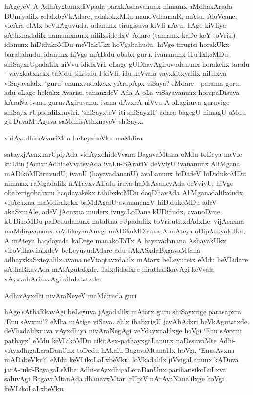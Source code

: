 hAgeyeV A AdhAyxtamxdiVpada parxkAshavanunx nimamx aMdhakArada BUmiyalilx celalxbeVkAdare, adakokxMdu manoVdhamaR, mAtu, AloVcane, vicAra elAlx beVkAguvudu. adanunx tirugisuva kiVli nAvu. hAge kiVliya sAthxnadalilx namamxnunx nililxsidedxV Adare (tamamx kaDe keY toVrisi) idanunx hiDidukoMDu meVlakUkx hoVgabahudu. hiVge tirugisi horakUkx barabahudu. idanunx hiVge mADalu obabx guru. ivananunx iTuTxkoMDu shiSayxrUpadalilx niVvu ididxVri. oLage gUDhavAgiruvudanunx horakekx taralu - vayxkatxkekx taMdu tiLisalu I kiVli. idu keVvala vayxkitxyalilx nilulxva viSayavalalx. `guru' enunxvudakekx yArapApx viSaya? eMdare - parama guru. adu oLage hokukx Avarisi, tananxdeV Ada A oLa viSayavanunx horapaDisuva kAraNa ivanu guruvAgiruvanu. ivana dAvxrA niVvu A oLagiruva guruvige shiSayx rUpadalilxruviri. `shiSayxteV iti shiSayxH' adara bagegU nimagU oMdu gUDuvaMtAguva saMdhisAthxnaveV shiSayx.

vidAyxdhideVvariMda beLeyabeVku maMdira

satayxjAcnxnarUpiyAda vidAyxdhideVvana-BagavaMtana oMdu toDeya meVle kuLitu jAcnxnAdhideVvateyAda ivaLu-BAratiV deVviyU ivananunx AliMgana mADikoMDiruvudU, ivanU (hayavadananU) avaLanunx biDadeV hiDidukoMDu nimamx raMgadalilx nATayxvADalu iruva haMsAsaneyAda deVviyU, hiVge obabxrigobabxru haqdayakekx tabibxkoMDu daqDhavAda AliMganadalilxdudx, vijAcnxna maMdirakekx baMdAgalU avananenxV hiDidukoMDu adeV akaSxmAle, adeV jAcnxna muderx ivugaLoDane kUDidudx, avanoDane kUDikoMDu paDedudanunx nataRna rUpadalilx toVrisutitxdAdxLe. vijAcnxna maMdiravanunx veVdikeyanAnxgi mADikoMDiruva A mAteya aBipArxyakUkx, A mAteya haqdayada kaDege manakoTaTx A hayavadanana AshayakUkx viroVdhavilalxdeV beLeyuvudAdare adu sAkASxdaBxgavaMtana adhayxkaSxteyalilx avana neVtaqtavxdalilx mAtarx beLeyutetx eMdu heVLidare sAthaRkavAda mAtAgutatxde. ilalxdidadxre nirathaRkavAgi keVvala vAyxvahArikavAgi nilulxtatxde.

AdhivAyxdhi nivAraNeyeV maMdirada guri

hAge sAthaRkavAgi beLeyuva jAgadalilx mAtarx guru shiSayxrige parasapxra `Enu sAvxmi'? eMba mAtige viSaya. alilx ibabxrigU javAbAdxri beVkAgutatxde. deVhadalilxruva vAyxdhiya nivAraNegAgi veYdayxnalilxge hoVgi `Enu sAvxmi pathayx' eMdu keVLikoMDu cikitAsx-pathayxgaLanunx naDesuvaMte Adhi-vAyxdhigaLeraDanUnx toDedu hAkalu BagavaMtanalilx hoVgi, `EnusAvxmi mADabeVku?' eMdu keVLikoLaLxbeVku. loVkadalilx jiVvigaLanunx kADuva jarA-rukf-BayagaLeMba Adhi-vAyxdhigaLeraDanUnx pariharisikoLuLxva saluvAgi BagavaMtanAda dhanavxMtari rUpiV nArAyaNanalilxge hoVgi keVLikoLaLxbeVku.

